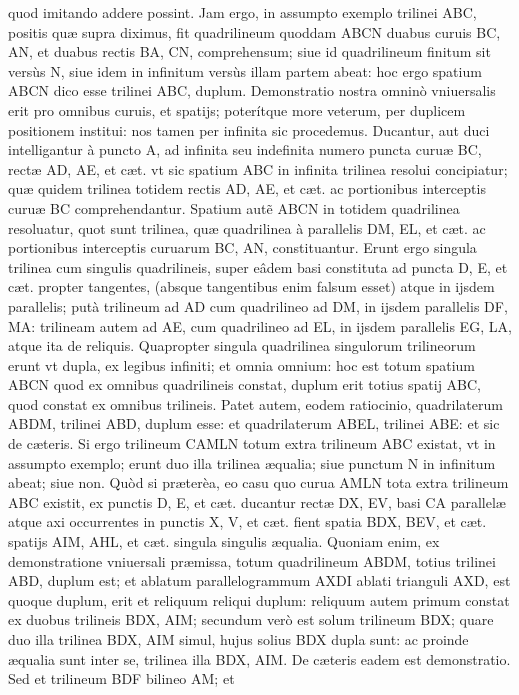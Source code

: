 \documentclass[11pt,a4paper]{article}
\begin{document}
quod imitando addere possint. Jam ergo, in assumpto exemplo trilinei ABC, positis quæ supra diximus, fit quadrilineum quoddam ABCN duabus curuis BC, AN, et duabus rectis BA, CN, comprehensum; siue id quadrilineum finitum sit versùs N, siue idem in infinitum versùs illam partem abeat: hoc ergo spatium ABCN dico esse trilinei ABC, duplum. Demonstratio nostra omninò vniuersalis erit pro omnibus curuis, et spatijs; poterítque more veterum, per duplicem positionem institui: nos tamen per infinita sic procedemus. Ducantur, aut duci intelligantur à puncto A, ad infinita seu indefinita numero puncta curuæ BC, rectæ AD, AE, et cæt. vt sic spatium ABC in infinita trilinea resolui concipiatur; quæ quidem trilinea totidem rectis AD, AE, et cæt. ac portionibus interceptis curuæ BC comprehendantur. Spatium autẽ ABCN in totidem quadrilinea resoluatur, quot sunt trilinea, quæ quadrilinea à parallelis DM, EL, et cæt. ac portionibus interceptis curuarum BC, AN, constituantur. Erunt ergo singula trilinea cum singulis quadrilineis, super eâdem basi constituta ad puncta D, E, et cæt. propter tangentes, (absque tangentibus enim falsum esset) atque in ijsdem parallelis; putà trilineum ad AD cum quadrilineo ad DM, in ijsdem parallelis DF, MA: trilineam autem ad AE, cum quadrilineo ad EL, in ijsdem parallelis EG, LA, atque ita de reliquis. Quapropter singula quadrilinea singulorum trilineorum erunt vt dupla, ex legibus infiniti; et omnia omnium: hoc est totum spatium ABCN quod ex omnibus quadrilineis constat, duplum erit totius spatij ABC, quod constat ex omnibus trilineis. Patet autem, eodem ratiocinio, quadrilaterum ABDM, trilinei ABD, duplum esse: et quadrilaterum ABEL, trilinei ABE: et sic de cæteris. Si ergo trilineum CAMLN totum extra trilineum ABC existat, vt in assumpto exemplo; erunt duo illa trilinea æqualia; siue punctum N in infinitum abeat; siue non. Quòd si præterèa, eo casu quo curua AMLN tota extra trilineum ABC existit, ex punctis D, E, et cæt. ducantur rectæ DX, EV, basi CA parallelæ atque axi occurrentes in punctis X, V, et cæt. fient spatia BDX, BEV, et cæt. spatijs AIM, AHL, et cæt. singula singulis æqualia. Quoniam enim, ex demonstratione vniuersali præmissa, totum quadrilineum ABDM, totius trilinei ABD, duplum est; et ablatum parallelogrammum AXDI ablati trianguli AXD, est quoque duplum, erit et reliquum reliqui duplum: reliquum autem primum constat ex duobus trilineis BDX, AIM; secundum verò est solum trilineum BDX; quare duo illa trilinea BDX, AIM simul, hujus solius BDX dupla sunt: ac proinde æqualia sunt inter se, trilinea illa BDX, AIM. De cæteris eadem est demonstratio. Sed et trilineum BDF bilineo AM; et
\end{document}
